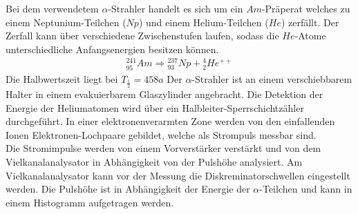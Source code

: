 Bei dem verwendetem $\alpha$-Strahler handelt es sich um ein $Am$-Präperat welches zu einem Neptunium-Teilchen ($Np$) und einem Helium-Teilchen ($He$) zerfällt.
Der Zerfall kann über verschiedene Zwischenstufen laufen, sodass die $He$-Atome unterschiedliche Anfangsenergien besitzen können.
\begin{align*}
  {}^{241}_{95}Am \Rightarrow {}^{237}_{93}Np+{}^4_2He^{++}
\end{align*}
Die Halbwertszeit liegt bei $T_{\frac{1}{2}}=458a$
Der $\alpha$-Strahler ist an einem verschiebbarem Halter in einem evakuierbarem Glaszylinder angebracht. Die Detektion der Energie der Heliumatomen wird über ein
Halbleiter-Sperrschichtzähler durchgeführt. In einer elektronenverarmten Zone werden von den einfallenden Ionen Elektronen-Lochpaare gebildet, welche als Strompuls messbar sind.\\
Die Stromimpulse werden von einem Vorverstärker verstärkt und von dem Vielkanalanalysator in Abhängigkeit von der Pulshöhe analysiert.
Am Vielkanalanalysator kann vor der Messung die Diskreminatorschwellen eingestellt werden.
Die Pulshöhe ist in Abhängigkeit der Energie der $\alpha$-Teilchen und kann in einem Histogramm aufgetragen werden.
